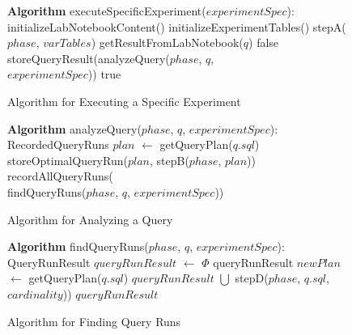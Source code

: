 \begin{figure}[t]
\begin{center}
\begin{algorithmic}
{\bf Algorithm} executeSpecificExperiment($experimentSpec$):
\STATE initializeLabNotebookContent()
\STATE initializeExperimentTables()
\STATE stepA($phase$, $varTables$)
      \STATE getResultFromLabNotebook($q$)
      \RETURN false
    \ELSE
      \STATE storeQueryResult(analyzeQuery($phase$, $q$, \\
      \hspace{47.0mm}$experimentSpec$))
    \ENDIF
  \ENDFOR
\ENDFOR
\RETURN true
\end{algorithmic}
\caption{Algorithm for Executing a Specific Experiment\label{alg:exeSpecExp}}
\end{center}
\end{figure}

\begin{figure}[t]
\begin{center}
\begin{algorithmic}
{\bf Algorithm} analyzeQuery($phase$, $q$, $experimentSpec$):
  RecordedQueryRuns
  \STATE $plan$ $\leftarrow$ getQueryPlan($q.sql$)
  \STATE storeOptimalQueryRun($plan$, stepB($phase$, $plan$))
\ENDIF
\RETURN recordAllQueryRuns(\\
\hspace{18.0mm}findQueryRuns($phase$, $q$, $experimentSpec$))
\end{algorithmic}
\caption{Algorithm for Analyzing a Query\label{alg:analyzeQuery}}
\end{center}
\end{figure}

\begin{figure}[t]
\begin{center}
\begin{algorithmic}
{\bf Algorithm} findQueryRuns($phase$, $q$, $experimentSpec$):
  QueryRunResult
\STATE $queryRunResult$ $\leftarrow$ $\Phi$
  \RETURN queryRunResult
\ENDIF
\STATE $newPlan$ $\leftarrow$ getQueryPlan($q.sql$)
  \STATE $queryRunResult$ $\bigcup$ stepD($phase$, $q.sql$, \\
  \hspace{40.0mm} $cardinality$))
\ENDIF
\ENDFOR
\RETURN $queryRunResult$
\end{algorithmic}
\caption{Algorithm for Finding Query Runs\label{alg:findQueryRuns}}
\end{center}
\end{figure}

